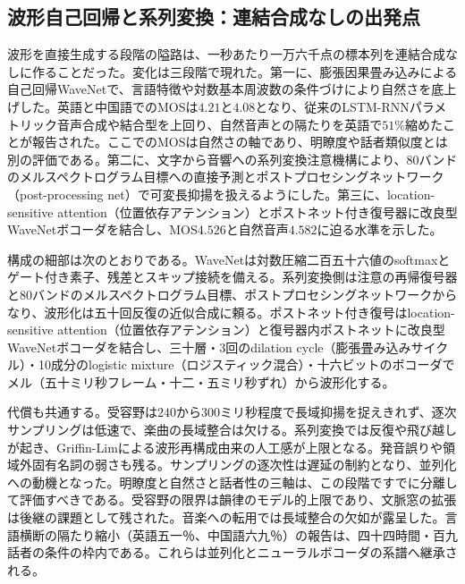 \documentclass[lualatex,a4paper,10pt]{jlreq}
\begin{document}
\subsection{波形自己回帰と系列変換：連結合成なしの出発点}
波形を直接生成する段階の隘路は、一秒あたり一万六千点の標本列を連結合成なしに作ることだった\autocite{btd051}。変化は三段階で現れた。第一に、膨張因果畳み込みによる自己回帰WaveNetで、言語特徴や対数基本周波数の条件づけにより自然さを底上げした\autocite{btd051}。英語と中国語でのMOSは$4.21$と$4.08$となり、従来のLSTM-RNNパラメトリック音声合成や結合型を上回り、自然音声との隔たりを英語で$51\%$縮めたことが報告された\autocite{btd051}。ここでのMOSは自然さの軸であり、明瞭度や話者類似度とは別の評価である\autocite{btd051}。第二に、文字から音響への系列変換注意機構により、80バンドのメルスペクトログラム目標への直接予測とポストプロセシングネットワーク（post-processing net）で可変長抑揚を扱えるようにした\autocite{btd052}。第三に、location-sensitive attention（位置依存アテンション）とポストネット付き復号器に改良型WaveNetボコーダを結合し、MOS$4.526$と自然音声$4.582$に迫る水準を示した\autocite{btd053}。

構成の細部は次のとおりである。WaveNetは対数圧縮二百五十六値のsoftmaxとゲート付き素子、残差とスキップ接続を備える\autocite{btd051}。系列変換側は注意の再帰復号器と80バンドのメルスペクトログラム目標、ポストプロセシングネットワークからなり、波形化は五十回反復の近似合成に頼る\autocite{btd052}。ポストネット付き復号はlocation-sensitive attention（位置依存アテンション）と復号器内ポストネットに改良型WaveNetボコーダを結合し、三十層・3回のdilation cycle（膨張畳み込みサイクル）・10成分のlogistic mixture（ロジスティック混合）・十六ビットのボコーダでメル（五十ミリ秒フレーム・十二・五ミリ秒ずれ）から波形化する\autocite{btd053}。

代償も共通する。受容野は$240$から$300$ミリ秒程度で長域抑揚を捉えきれず、逐次サンプリングは低速で、楽曲の長域整合は欠ける\autocite{btd051}。系列変換では反復や飛び越しが起き、Griffin-Limによる波形再構成由来の人工感が上限となる\autocite{btd052}。発音誤りや領域外固有名詞の弱さも残る\autocite{btd053}。サンプリングの逐次性は遅延の制約となり、並列化への動機となった\autocite{btd051,btd054}。明瞭度と自然さと話者性の三軸は、この段階ですでに分離して評価すべきである\autocite{btd051,btd052,btd053}。受容野の限界は韻律のモデル的上限であり、文脈窓の拡張は後継の課題として残された。音楽への転用では長域整合の欠如が露呈した\autocite{btd051}。言語横断の隔たり縮小（英語五一％、中国語六九％）の報告は、四十四時間・百九話者の条件の枠内である\autocite{btd051}。これらは並列化とニューラルボコーダの系譜へ継承される\autocite{btd051,btd052,btd053,btd054}。
\end{document}
